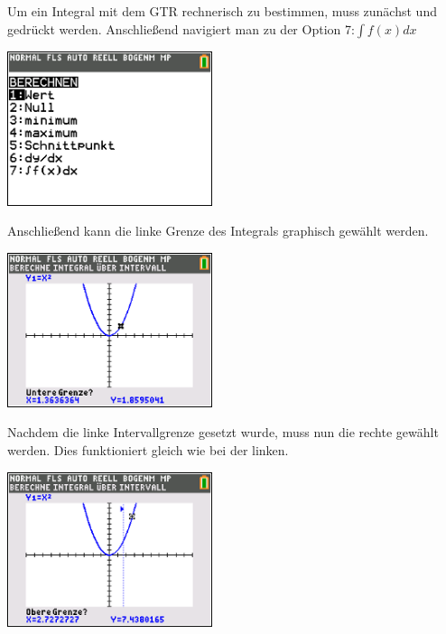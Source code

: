 \begin{paracol}{2}
\begin{flushleft}
	Um ein Integral mit dem GTR rechnerisch zu bestimmen, muss zunächst  und  gedrückt werden. Anschließend navigiert man zu der Option 7:$\int f(x)dx$
\end{flushleft}	
\switchcolumn
\begin{flushright}
	\includegraphics[width=6cm]{Media/GRT/Visualisierung/Integrale_berechnen/Integrale_berechnen_1.png}
\end{flushright}
\end{paracol}

\begin{paracol}{2}
\begin{flushleft}
	Anschließend kann die linke Grenze des Integrals graphisch gewählt werden.
\end{flushleft}	
\switchcolumn
\begin{flushright}
	\includegraphics[width=6cm]{Media/GRT/Visualisierung/Integrale_berechnen/Integrale_berechnen_2.png}
\end{flushright}
\end{paracol}

\begin{paracol}{2}
\begin{flushleft}
	Nachdem die linke Intervallgrenze gesetzt wurde, muss nun die rechte gewählt werden. Dies funktioniert gleich wie bei der linken.
\end{flushleft}	
\switchcolumn
\begin{flushright}
	\includegraphics[width=6cm]{Media/GRT/Visualisierung/Integrale_berechnen/Integrale_berechnen_3.png}
\end{flushright}
\end{paracol}

